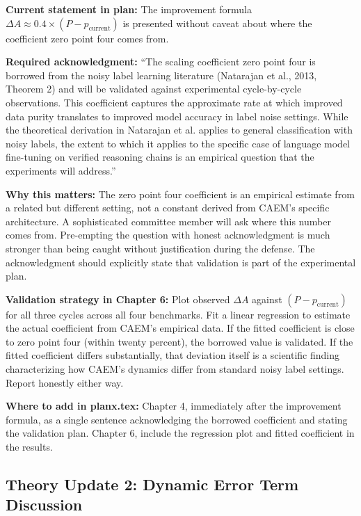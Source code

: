 \documentclass[11pt,a4paper]{article}
\newcommand{\theorybox}[2]{%
\begin{tcolorbox}[enhanced,breakable,
  colback=LightForest,colframe=ForestGreen,boxrule=1.5pt,arc=4pt,
  left=8pt,right=8pt,top=6pt,bottom=6pt,
  title={\bfseries\small\color{white}#1},
  attach boxed title to top left={yshift=-2mm,xshift=6mm},
  boxed title style={colback=ForestGreen,arc=3pt,boxrule=0pt,
    left=4pt,right=4pt,top=2pt,bottom=2pt}]
#2
\end{tcolorbox}}
\begin{document}
\theorybox{THEORY UPDATE 1: Acknowledge Borrowed Improvement Coefficient}{
\textbf{Current statement in plan:} The improvement formula $\Delta A \approx 0.4 \times (P - p_{\text{current}})$ is presented without caveat about where the coefficient zero point four comes from.

\textbf{Required acknowledgment:} ``The scaling coefficient zero point four is borrowed from the noisy label learning literature (Natarajan et al., 2013, Theorem 2) and will be validated against experimental cycle-by-cycle observations. This coefficient captures the approximate rate at which improved data purity translates to improved model accuracy in label noise settings. While the theoretical derivation in Natarajan et al. applies to general classification with noisy labels, the extent to which it applies to the specific case of language model fine-tuning on verified reasoning chains is an empirical question that the experiments will address.''

\textbf{Why this matters:} The zero point four coefficient is an empirical estimate from a related but different setting, not a constant derived from CAEM's specific architecture. A sophisticated committee member will ask where this number comes from. Pre-empting the question with honest acknowledgment is much stronger than being caught without justification during the defense. The acknowledgment should explicitly state that validation is part of the experimental plan.

\textbf{Validation strategy in Chapter 6:} Plot observed $\Delta A$ against $(P - p_{\text{current}})$ for all three cycles across all four benchmarks. Fit a linear regression to estimate the actual coefficient from CAEM's empirical data. If the fitted coefficient is close to zero point four (within twenty percent), the borrowed value is validated. If the fitted coefficient differs substantially, that deviation itself is a scientific finding characterizing how CAEM's dynamics differ from standard noisy label settings. Report honestly either way.

\textbf{Where to add in planx.tex:} Chapter 4, immediately after the improvement formula, as a single sentence acknowledging the borrowed coefficient and stating the validation plan. Chapter 6, include the regression plot and fitted coefficient in the results.
}

\subsection{Theory Update 2: Dynamic Error Term Discussion}
\end{document}
